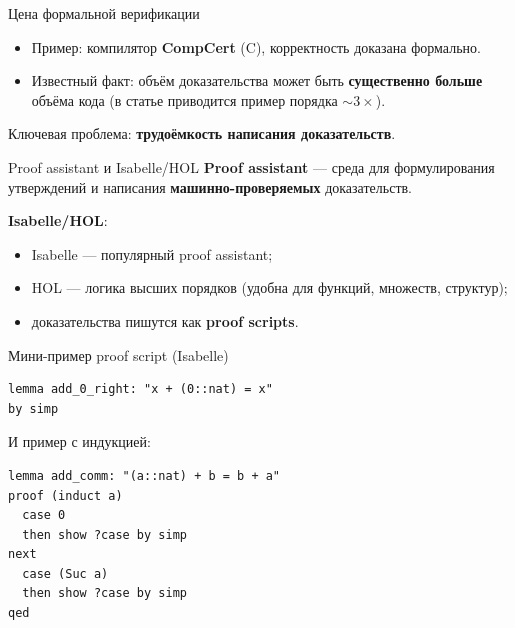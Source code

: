 \begin{frame}{Цена формальной верификации}
\begin{itemize}
  \item Пример: компилятор \textbf{CompCert} (C), корректность доказана формально.
  \item Известный факт: объём доказательства может быть \textbf{существенно больше} объёма кода (в статье приводится пример порядка \(\sim 3\times\)).
\end{itemize}

\vspace{2mm}
Ключевая проблема: \textbf{трудоёмкость написания доказательств}.
\end{frame}

\begin{frame}{Proof assistant и Isabelle/HOL}
\textbf{Proof assistant} — среда для формулирования утверждений и написания \textbf{машинно-проверяемых} доказательств.

\vspace{2mm}
\textbf{Isabelle/HOL}:
\begin{itemize}
  \item Isabelle — популярный proof assistant;
  \item HOL — логика высших порядков (удобна для функций, множеств, структур);
  \item доказательства пишутся как \textbf{proof scripts}.
\end{itemize}
\end{frame}

\begin{frame}[fragile]{Мини-пример proof script (Isabelle)}
\lstset{style=code, language=}
\begin{lstlisting}
lemma add_0_right: "x + (0::nat) = x"
by simp
\end{lstlisting}

\vspace{1mm}
И пример с индукцией:
\begin{lstlisting}
lemma add_comm: "(a::nat) + b = b + a"
proof (induct a)
  case 0
  then show ?case by simp
next
  case (Suc a)
  then show ?case by simp
qed
\end{lstlisting}
\end{frame}

